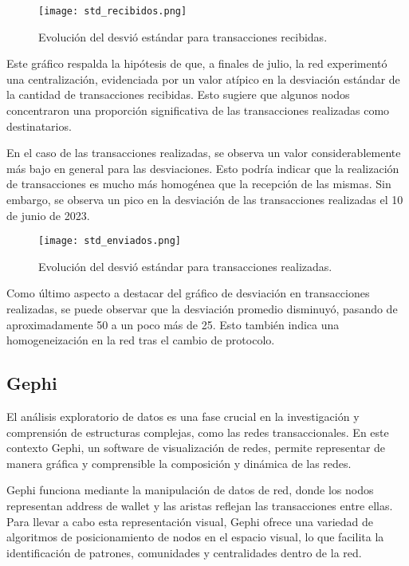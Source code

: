 \documentclass{article}
\begin{document}
\begin{figure}[h!]
    \centering
    \texttt{[image: std\_recibidos.png]} %
    \caption{Evolución del desvió estándar para transacciones recibidas.}
    \label{fig:ejemplo}
\end{figure}

Este gráfico respalda la hipótesis de que, a finales de julio, la red experimentó una centralización, evidenciada por un valor atípico en la desviación estándar de la cantidad de transacciones recibidas. Esto sugiere que algunos nodos concentraron una proporción significativa de las transacciones realizadas como destinatarios.

En el caso de las transacciones realizadas, se observa un valor considerablemente más bajo en general para las desviaciones. Esto podría indicar que la realización de transacciones es mucho más homogénea que la recepción de las mismas. Sin embargo, se observa un pico en la desviación de las transacciones realizadas el 10 de junio de 2023. 

\begin{figure}[h!]
    \centering
    \texttt{[image: std\_enviados.png]} %
    \caption{Evolución del desvió estándar para transacciones realizadas.}
    \label{fig:ejemplo}
\end{figure}
Como último aspecto a destacar del gráfico de desviación en transacciones realizadas, se puede observar que la desviación promedio disminuyó, pasando de aproximadamente 50 a un poco más de 25. Esto también indica una homogeneización en la red tras el cambio de protocolo.

\subsection{Gephi}
El análisis exploratorio de datos es una fase crucial en la investigación y comprensión de estructuras complejas, como las redes transaccionales. En este contexto Gephi, un software de visualización de redes, permite representar de manera gráfica y comprensible la composición y dinámica de las redes.

Gephi funciona mediante la manipulación de datos de red, donde los nodos representan address de wallet y las aristas reflejan las transacciones entre ellas. Para llevar a cabo esta representación visual, Gephi ofrece una variedad de algoritmos de posicionamiento de nodos en el espacio visual, lo que facilita la identificación de patrones, comunidades y centralidades dentro de la red.
\end{document}
